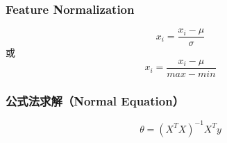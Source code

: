 \subsubsection{Feature Normalization}
\begin{equation}
	x_i = \frac{x_i - \mu}{\sigma}
\end{equation}
或
\begin{equation}
	x_i = \frac{x_i - \mu}{max - min}
\end{equation}



\subsubsection{公式法求解（Normal Equation）}
\begin{equation}
	\theta = (X^T X)^{-1} X^T y
\end{equation}

































